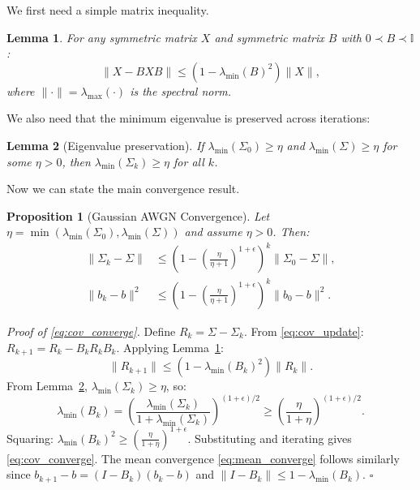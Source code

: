 \documentclass[12pt,fleqn]{article}
\numberwithin{equation}{section}
\newtheorem{proposition}{Proposition}
\newtheorem{lemma}{Lemma}
\newcommand{\I}{\mathbb{I}}
\begin{document}
We first need a simple matrix inequality.

\begin{lemma}\label{lem:matrix}
For any symmetric matrix $X$ and symmetric matrix $B$ with $0 \prec B \prec \I$:
\[
	\|X - BXB\| \leq (1 - \lambda_{\min}(B)^2)\|X\|,
\]
where $\|\cdot\| = \lambda_{\max}(\cdot)$ is the spectral norm.
\end{lemma}

We also need that the minimum eigenvalue is preserved across iterations:

\begin{lemma}[Eigenvalue preservation]\label{lem:eigenvalue}
If $\lambda_{\min}(\Sigma_0) \geq \eta$ and $\lambda_{\min}(\Sigma) \geq \eta$ for some $\eta > 0$, then $\lambda_{\min}(\Sigma_k) \geq \eta$ for all $k$.
\end{lemma}

Now we can state the main convergence result.

\begin{proposition}[Gaussian AWGN Convergence]\label{prop:convergence}
Let $\eta = \min(\lambda_{\min}(\Sigma_0), \lambda_{\min}(\Sigma))$ and assume $\eta > 0$. Then:
\begin{align}
	\|\Sigma_k - \Sigma\| &\leq \left(1 - \left(\frac{\eta}{\eta + 1}\right)^{1+\epsilon}\right)^k \|\Sigma_0 - \Sigma\|, \label{eq:cov_converge}\\
	\|b_k - b\|^2 &\leq \left(1 - \left(\frac{\eta}{\eta + 1}\right)^{1+\epsilon}\right)^k \|b_0 - b\|^2. \label{eq:mean_converge}
\end{align}
\end{proposition}

\noindent\textit{Proof of \eqref{eq:cov_converge}.} Define $R_k = \Sigma - \Sigma_k$. From \eqref{eq:cov_update}: $R_{k+1} = R_k - B_k R_k B_k$. Applying Lemma~\ref{lem:matrix}:
\[
	\|R_{k+1}\| \leq (1 - \lambda_{\min}(B_k)^2)\|R_k\|.
\]
From Lemma~\ref{lem:eigenvalue}, $\lambda_{\min}(\Sigma_k) \geq \eta$, so:
\[
	\lambda_{\min}(B_k) = \left(\frac{\lambda_{\min}(\Sigma_k)}{1 + \lambda_{\min}(\Sigma_k)}\right)^{(1+\epsilon)/2} \geq \left(\frac{\eta}{1+\eta}\right)^{(1+\epsilon)/2}.
\]
Squaring: $\lambda_{\min}(B_k)^2 \geq \left(\frac{\eta}{1+\eta}\right)^{1+\epsilon}$. Substituting and iterating gives \eqref{eq:cov_converge}. The mean convergence \eqref{eq:mean_converge} follows similarly since $b_{k+1} - b = (I - B_k)(b_k - b)$ and $\|I - B_k\| \leq 1 - \lambda_{\min}(B_k)$. \hfill$\square$
\end{document}
